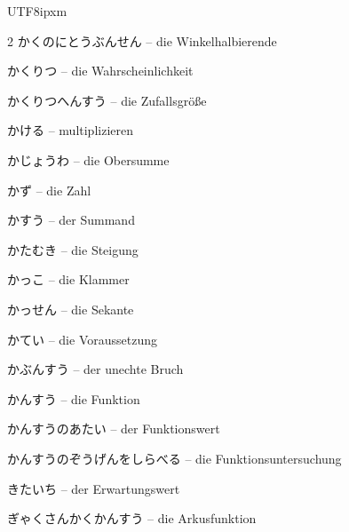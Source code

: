 \begin{CJK}{UTF8}{ipxm}
\begin{multicols}{2}
 {\footnotesize\color{black!70}かくのにとうぶんせん} -- die Winkelhalbierende\dotfill\hyperref[e:156]{\pageref*{e:156}}\par
{} {\footnotesize\color{black!70}かくりつ} -- die Wahrscheinlichkeit\dotfill\hyperref[e:330]{\pageref*{e:330}}\par
{} {\footnotesize\color{black!70}かくりつへんすう} -- die Zufallsgröße\dotfill\hyperref[e:334]{\pageref*{e:334}}\par
{} {\footnotesize\color{black!70}かける} -- multiplizieren\dotfill\hyperref[e:21]{\pageref*{e:21}}\par
{} {\footnotesize\color{black!70}かじょうわ} -- die Obersumme\dotfill\hyperref[e:293]{\pageref*{e:293}}\par
{} {\footnotesize\color{black!70}かず} -- die Zahl\dotfill\hyperref[e:1]{\pageref*{e:1}}\par
{} {\footnotesize\color{black!70}かすう} -- der Summand\dotfill\hyperref[e:16]{\pageref*{e:16}}\par
{} {\footnotesize\color{black!70}かたむき} -- die Steigung\dotfill\hyperref[e:120]{\pageref*{e:120}}\par
{} {\footnotesize\color{black!70}かっこ} -- die Klammer\dotfill\hyperref[e:87]{\pageref*{e:87}}\par
{} {\footnotesize\color{black!70}かっせん} -- die Sekante\dotfill\hyperref[e:219]{\pageref*{e:219}}\par
{} {\footnotesize\color{black!70}かてい} -- die Voraussetzung\dotfill\hyperref[e:348]{\pageref*{e:348}}\par
{} {\footnotesize\color{black!70}かぶんすう} -- der unechte Bruch\dotfill\hyperref[e:32]{\pageref*{e:32}}\par
{} {\footnotesize\color{black!70}かんすう} -- die Funktion\dotfill\hyperref[e:105]{\pageref*{e:105}}\par
{} {\footnotesize\color{black!70}かんすうのあたい} -- der Funktionswert\dotfill\hyperref[e:108]{\pageref*{e:108}}\par
{} {\footnotesize\color{black!70}かんすうのぞうげんをしらべる} -- die Funktionsuntersuchung\dotfill\hyperref[e:280]{\pageref*{e:280}}\par
{} {\footnotesize\color{black!70}きたいち} -- der Erwartungswert\dotfill\hyperref[e:335]{\pageref*{e:335}}\par
{} {\footnotesize\color{black!70}ぎゃくさんかくかんすう} -- die Arkusfunktion\dotfill\hyperref[e:136]{\pageref*{e:136}}\par

\end{multicols}
\end{CJK}
